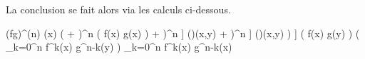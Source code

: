 La conclusion se fait alors via les calculs ci-dessous.

\begin{stepcalc}[style=sar]
	(fg)^{(n)} (x)
\explnext{}
    \big(  +  \big)^n \big( f(x) g(x) \big)
\explnext{}
    \Big[
    	\big( \pderope[f]{x}{1} +  \big)^n \circ \Lambda
	\Big]
	(\pi)(x,y)
    \Big[
    	\Lambda \circ \big( \pderope[f]{x}{1} +  \big)^n
	\Big]
	(\pi)(x,y)
\explnext{}
    \Big[
    	\Lambda \circ \big( \dsum_{k=0}^n \combi[n][k]  \circ {} \big)
	\Big]
	\big( f(x) g(y) \big)
%
%
\explnext{}
    \Lambda \big( \dsum_{k=0}^n \combi[n][k] f^k(x) g^{n-k}(y) \big)
\explnext{}
	\dsum_{k=0}^n \combi[n][k] f^k(x) g^{n-k}(x)
\end{stepcalc}